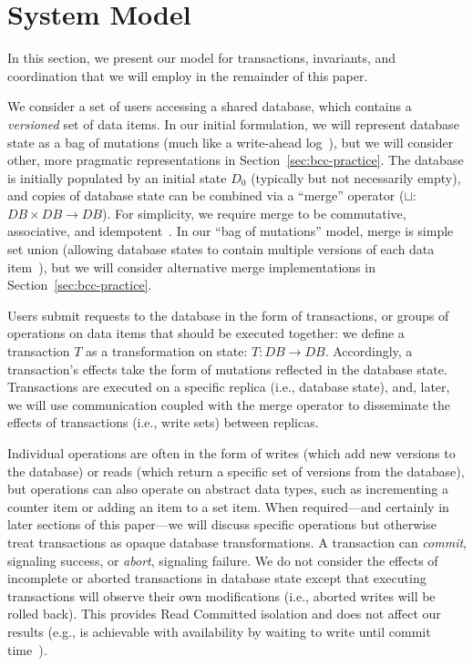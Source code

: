 
\section{System Model}
\label{sec:model}

In this section, we present our model for transactions, invariants,
and coordination that we will employ in the remainder of this paper.

 We consider a set of users accessing a shared
database, which contains a \textit{versioned} set of data items. In
our initial formulation, we will represent database state as a bag of
mutations (much like a write-ahead log~\cite{bernstein-book}), but we will
consider other, more pragmatic representations in
Section~\ref{sec:bcc-practice}. The database is initially populated by
an initial state $D_0$ (typically but not necessarily empty), and
copies of database state can be combined via a ``merge'' operator
($\sqcup$: $DB \times DB \rightarrow DB$).  For simplicity, we require
merge to be commutative, associative, and
idempotent~\cite{calm,crdt}. In our ``bag of mutations'' model, merge
is simple set union (allowing database states to contain multiple
versions of each data item~\cite{adya-isolation}), but we will
consider alternative merge implementations in
Section~\ref{sec:bcc-practice}.

 Users submit requests to the database in the
form of transactions, or groups of operations on data items that
should be executed together: we define a transaction $T$ as a
transformation on state: $T: DB \rightarrow DB$. Accordingly, a
transaction's effects take the form of mutations reflected in the
database state. Transactions are executed on a specific replica (i.e.,
database state), and, later, we will use communication coupled with
the merge operator to disseminate the effects of transactions (i.e.,
write sets) between replicas.

Individual operations are often in the form of writes (which add new
versions to the database) or reads (which return a specific set of
versions from the database), but operations can also operate on
abstract data types, such as incrementing a counter item or adding an
item to a set item. When required---and certainly in later sections of
this paper---we will discuss specific operations but otherwise treat
transactions as opaque database transformations. A transaction can
\textit{commit}, signaling success, or \textit{abort}, signaling
failure. We do not consider the effects of incomplete or aborted
transactions in database state except that executing transactions will
observe their own modifications (i.e., aborted writes will be rolled
back). This provides Read Committed isolation and does not affect our
results (e.g., is achievable with availability by waiting to write
until commit time~\cite{hat-vldb,spanner}).

